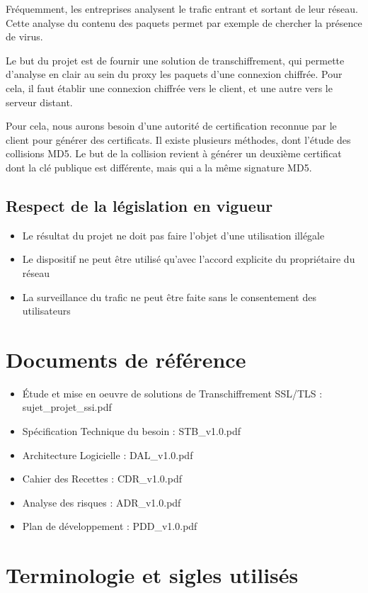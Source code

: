 \documentclass[a4paper,11pt,french]{article}
\begin{document}
Fréquemment, les entreprises analysent le trafic entrant et sortant de leur réseau. Cette analyse du contenu des paquets permet par exemple de chercher la présence de virus.


Le but du projet est de fournir une solution de transchiffrement, qui permette d'analyse en clair au sein du proxy les paquets d'une connexion chiffrée. Pour cela, il faut établir une connexion chiffrée vers le client, et une autre vers le serveur distant.


Pour cela, nous aurons besoin d'une autorité de certification reconnue par le client pour générer des certificats.
Il existe plusieurs méthodes, dont l'étude des collisions MD5.
Le but de la collision revient à générer un deuxième certificat dont la clé publique est différente, mais qui a la même signature MD5.


\subsection{Respect de la législation en vigueur}
\begin{itemize}

\item Le résultat du projet ne doit pas faire l'objet d'une utilisation illégale
\item Le dispositif ne peut être utilisé qu'avec l'accord explicite du propriétaire du réseau
\item La surveillance du trafic ne peut être faite sans le consentement des utilisateurs
\end{itemize}
\newpage
\section{Documents de référence}

\begin{itemize}
\item Étude et mise en oeuvre de solutions de Transchiffrement SSL/TLS : sujet\_projet\_ssi.pdf
\item Spécification Technique du besoin : STB\_v1.0.pdf
\item Architecture Logicielle : DAL\_v1.0.pdf
\item Cahier des Recettes : CDR\_v1.0.pdf
\item Analyse des risques : ADR\_v1.0.pdf
\item Plan de développement : PDD\_v1.0.pdf
\end{itemize}

\newpage
\section{Terminologie et sigles utilisés}
\end{document}

